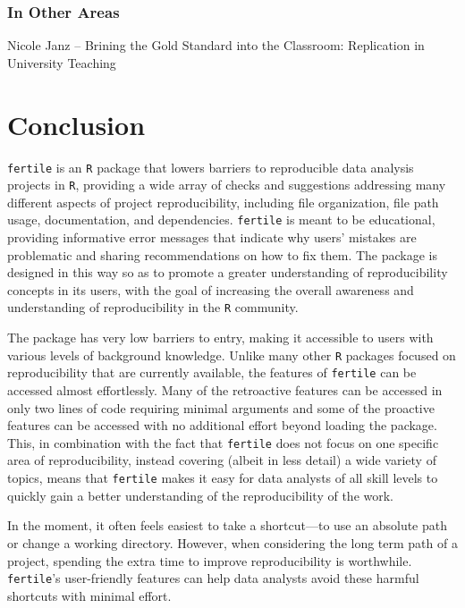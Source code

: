\documentclass[12pt,twoside]{reedthesis}
\begin{document}
\subsection{In Other Areas}\label{in-other-areas}

Nicole Janz -- Brining the Gold Standard into the Classroom: Replication
in University Teaching

\chapter*{Conclusion}\label{conclusion}

\texttt{fertile} is an \texttt{R} package that lowers barriers to
reproducible data analysis projects in \texttt{R}, providing a wide
array of checks and suggestions addressing many different aspects of
project reproducibility, including file organization, file path usage,
documentation, and dependencies. \texttt{fertile} is meant to be
educational, providing informative error messages that indicate why
users' mistakes are problematic and sharing recommendations on how to
fix them. The package is designed in this way so as to promote a greater
understanding of reproducibility concepts in its users, with the goal of
increasing the overall awareness and understanding of reproducibility in
the \texttt{R} community.

The package has very low barriers to entry, making it accessible to
users with various levels of background knowledge. Unlike many other
\texttt{R} packages focused on reproducibility that are currently
available, the features of \texttt{fertile} can be accessed almost
effortlessly. Many of the retroactive features can be accessed in only
two lines of code requiring minimal arguments and some of the proactive
features can be accessed with no additional effort beyond loading the
package. This, in combination with the fact that \texttt{fertile} does
not focus on one specific area of reproducibility, instead covering
(albeit in less detail) a wide variety of topics, means that
\texttt{fertile} makes it easy for data analysts of all skill levels to
quickly gain a better understanding of the reproducibility of the work.

In the moment, it often feels easiest to take a shortcut---to use an
absolute path or change a working directory. However, when considering
the long term path of a project, spending the extra time to improve
reproducibility is worthwhile. \texttt{fertile}'s user-friendly features
can help data analysts avoid these harmful shortcuts with minimal
effort.
\end{document}
